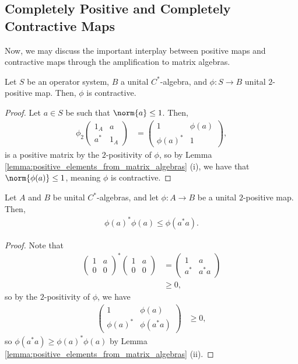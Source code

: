 \subsection{Completely Positive and Completely Contractive Maps}%
Now, we may discuss the important interplay between positive maps and contractive maps through the amplification to matrix algebras.
\begin{proposition}\label{prop:two_positive_contractive}
  Let $S$ be an operator system, $B$ a unital $C^{\ast}$-algebra, and $\phi\colon S\rightarrow B$ unital $2$-positive map. Then, $\phi$ is contractive.
\end{proposition}
\begin{proof}
  Let $a\in S$ be such that $\norm{a}\leq 1$. Then,
  \begin{align*}
    \phi_2 \begin{pmatrix}1_A & a \\ a^{\ast} & 1_A\end{pmatrix} &= \begin{pmatrix} 1 & \phi\left( a \right) \\ \phi\left( a \right)^{\ast} & 1\end{pmatrix},
  \end{align*}
  is a positive matrix by the $2$-positivity of $\phi$, so by Lemma \ref{lemma:positive_elements_from_matrix_algebras} (i), we have that $\norm{\phi(a)}\leq 1$, meaning $\phi$ is contractive.
\end{proof}
\begin{proposition}
  Let $A$ and $B$ be unital $C^{\ast}$-algebras, and let $\phi\colon A\rightarrow B$ be a unital $2$-positive map. Then,
  \begin{align*}
    \phi\left( a \right)^{\ast}\phi\left( a \right)\leq \phi\left( a^{\ast}a \right).
  \end{align*}
\end{proposition}
\begin{proof}
  Note that
  \begin{align*}
    \begin{pmatrix}1 & a \\ 0 & 0\end{pmatrix}^{\ast} \begin{pmatrix}1 & a \\ 0 & 0\end{pmatrix} &= \begin{pmatrix}1 & a \\ a^{\ast} & a^{\ast}a\end{pmatrix}\\
                     &\geq 0,
  \end{align*}
  so by the $2$-positivity of $\phi$, we have
  \begin{align*}
    \begin{pmatrix}1 & \phi\left( a \right) \\ \phi\left( a \right)^{\ast} & \phi\left( a^{\ast}a \right)\end{pmatrix} &\geq 0,
  \end{align*}
  so $\phi\left( a^{\ast}a \right) \geq \phi\left( a \right)^{\ast}\phi\left( a \right)$ by Lemma \ref{lemma:positive_elements_from_matrix_algebras} (ii).
\end{proof}
